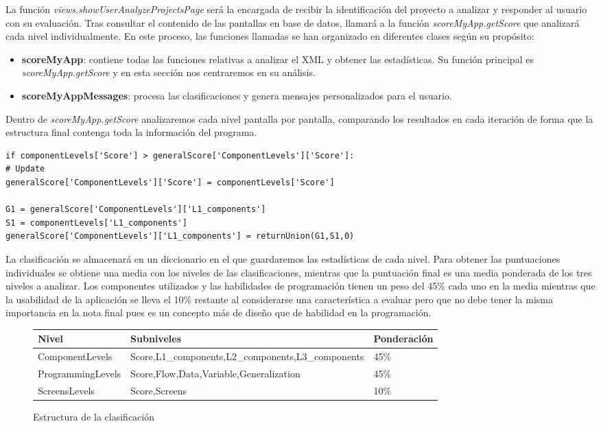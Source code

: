 \documentclass[a4paper, 12pt]{book}
\begin{document}
La función \textit{views.showUserAnalyzeProjectsPage} será la encargada de recibir la identificación del proyecto a analizar y responder al usuario con su evaluación. Tras consultar el contenido de las pantallas en base de datos, llamará a la función \textit{scoreMyApp.getScore} que analizará cada nivel individualmente. En este proceso, las funciones llamadas se han organizado en diferentes clases según su propósito:
\begin{itemize}
  \item \textbf{scoreMyApp}: contiene todas las funciones relativas a analizar el XML y obtener las estadísticas. Su función principal es \textit{scoreMyApp.getScore} y en esta sección nos centraremos en su análisis. 
  \item \textbf{scoreMyAppMessages}: procesa las clasificaciones y genera mensajes personalizados para el usuario.
\end{itemize}

Dentro de \textit{scoreMyApp.getScore} analizaremos cada nivel pantalla por pantalla, comparando los resultados en cada iteración de forma que la estructura final contenga toda la información del programa. 
\begin{lstlisting}
if componentLevels['Score'] > generalScore['ComponentLevels']['Score']:
# Update
generalScore['ComponentLevels']['Score'] = componentLevels['Score']

G1 = generalScore['ComponentLevels']['L1_components']
S1 = componentLevels['L1_components']
generalScore['ComponentLevels']['L1_components'] = returnUnion(G1,S1,0)
\end{lstlisting}
La clasificación se almacenará en un diccionario en el que guardaremos las estadísticas de cada nivel. Para obtener las puntuaciones individuales se obtiene una media con los niveles de las clasificaciones, mientras que la puntuación final es una media ponderada de los tres niveles a analizar. Los componentes utilizados y las habilidades de programación tienen un peso del 45\% cada uno en la media mientras que la usabilidad de la aplicación se lleva el 10\% restante al considerarse una característica a evaluar pero que no debe tener la misma importancia en la nota final pues es un concepto más de diseño que de habilidad en la programación.  
\begin{figure}
	\begin{center}
	    \begin{tabular}{| l | l | l | }
	    \hline
	    \textbf{Nivel} & \textbf{Subniveles} & \textbf{Ponderación} \\ \hline
	    ComponentLevels & Score,L1\_components,L2\_components,L3\_components & 45\% \\ \hline
	    ProgrammingLevels & Score,Flow,Data,Variable,Generalization & 45\% \\ \hline
	    ScreensLevels & Score,Screens & 10\% \\ \hline
            \end{tabular}
	\end{center}
	\caption{Estructura de la clasificación}
	\label{fig:scoreStructure}
\end{figure}
\end{document}
